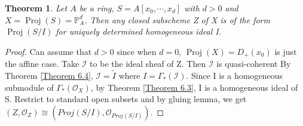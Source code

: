 \documentclass{ctexart}
\newtheorem{theorem}{Theorem}[section]
\newcommand{\proj}{\operatorname{Proj}}
\begin{document}
\begin{theorem}
    Let $A$ be a ring, $S = A[x_{0}, \cdots, x_{d}]$ with $d > 0$ and $X = \proj(S) = \mathbb{P}_{A}^{d}$.
    Then any closed subscheme Z of X is of the form $\proj(S/I)$ for uniquely determined homogeneous ideal I.
    \label{Theorem 6.5}
\end{theorem}
\begin{proof}
    Can assume that $d > 0$ since when $d = 0$, $\proj(X) = D_{+}(x_{0})$ is just the affine case.
    Take $\mathcal{I}$ to be the ideal sheaf of Z.
    Then $\mathcal{I}$ is quasi-coherent
    By Theorem \ref{Theorem 6.4}, $\mathcal{I} = \widetilde{I}$ where $I = \Gamma_{\ast}(\mathcal{I})$.
    Since I is a homogeneous submodule of $\Gamma_{\ast}(\mathcal{O}_{X})$, by Theorem \ref{Theorem 6.3}, I is a homogeneous ideal of S.
    Restrict to standard open subsets and by gluing lemma, we get $(Z, \mathcal{O}_{Z}) \cong (Proj(S/I), \mathcal{O}_{Proj(S/I)})$.
\end{proof}
\end{document}
